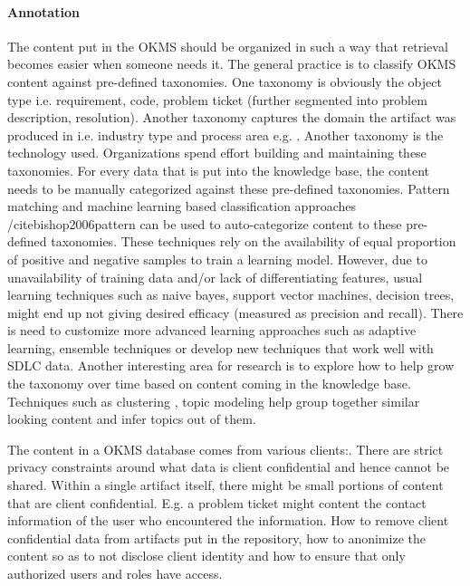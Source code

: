 \paragraph*{Annotation}
The content put in the OKMS should be organized in such a way that retrieval
becomes easier when someone needs it. The general practice is to classify OKMS
content against pre-defined taxonomies. One taxonomy is obviously the object
type i.e. requirement, code, problem ticket (further segmented into problem
description, resolution). Another taxonomy captures the domain the artifact was
produced in i.e. industry type and process area e.g. \cite{apqc,bph}. Another
taxonomy is the technology used. Organizations spend effort building and
maintaining these taxonomies. For every data that is put into the knowledge
base, the content needs to be manually categorized against these pre-defined
taxonomies. Pattern matching and machine learning based classification
approaches /cite{bishop2006pattern} can be used to auto-categorize content to
these pre-defined taxonomies. These techniques rely on the availability of equal
proportion of positive and negative samples to train a learning model. However,
due to unavailability of training data and/or lack of differentiating features,
usual learning techniques such as naive bayes, support vector machines, decision
trees, might end up not giving desired efficacy (measured as precision and
recall). There is need to customize more advanced learning approaches such as
adaptive learning, ensemble techniques or develop new techniques that work well
with SDLC data. Another interesting area for research is to explore how to help
grow the taxonomy over time based on content coming in the knowledge
base. Techniques such as clustering \cite{Berkhin06}, topic
modeling \cite{Blei:2012} help group together similar looking content and infer
topics out of them.

The content in a OKMS database comes from various clients:. There are strict privacy constraints around what data is client confidential and hence cannot be shared. Within a single artifact itself, there might be small portions of content that are client confidential. E.g. a problem ticket might content the contact information of the user who encountered the information. How to remove client confidential data from artifacts put in the repository, how to anonimize the content so as to not disclose client identity and how to ensure that only authorized users and roles have access.

